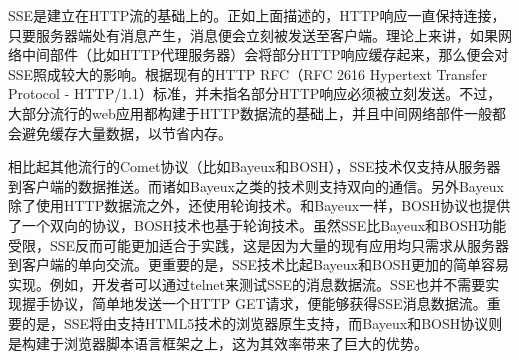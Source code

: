 SSE是建立在HTTP流的基础上的。正如上面描述的，HTTP响应一直保持连接，只要服务器端处有消息产生，消息便会立刻被发送至客户端。理论上来讲，如果网络中间部件（比如HTTP代理服务器）会将部分HTTP响应缓存起来，那么便会对SSE照成较大的影响。根据现有的HTTP RFC（RFC 2616 Hypertext Transfer Protocol - HTTP/1.1）标准，并未指名部分HTTP响应必须被立刻发送。不过，大部分流行的web应用都构建于HTTP数据流的基础上，并且中间网络部件一般都会避免缓存大量数据，以节省内存。

相比起其他流行的Comet协议（比如Bayeux和BOSH），SSE技术仅支持从服务器到客户端的数据推送。而诸如Bayeux之类的技术则支持双向的通信。另外Bayeux除了使用HTTP数据流之外，还使用轮询技术。和Bayeux一样，BOSH协议也提供了一个双向的协议，BOSH技术也基于轮询技术。虽然SSE比Bayeux和BOSH功能受限，SSE反而可能更加适合于实践，这是因为大量的现有应用均只需求从服务器到客户端的单向交流。更重要的是，SSE技术比起Bayeux和BOSH更加的简单容易实现。例如，开发者可以通过telnet来测试SSE的消息数据流。SSE也并不需要实现握手协议，简单地发送一个HTTP GET请求，便能够获得SSE消息数据流。重要的是，SSE将由支持HTML5技术的浏览器原生支持，而Bayeux和BOSH协议则是构建于浏览器脚本语言框架之上，这为其效率带来了巨大的优势。

















